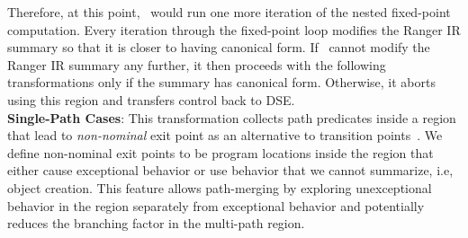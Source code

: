%
Therefore, at this point, \tool\ would run one more iteration of the nested fixed-point computation.
%
Every iteration through the fixed-point loop modifies the Ranger IR summary so that it is closer to having canonical
form.
%
If \tool\ cannot modify the Ranger IR summary any further, it then proceeds with the following transformations only
if the summary has canonical form.
%
Otherwise, it aborts using this region and transfers control back to DSE.\\
%
\textbf{Single-Path Cases}: This transformation collects path predicates inside a region that lead to
\textit{non-nominal} exit point as an alternative to transition points~\cite{veritesting}.
%
We define non-nominal exit points to be program locations inside the region that either cause
exceptional behavior or use behavior that we cannot summarize, i.e, object creation.
%
This feature allows path-merging by exploring unexceptional behavior in the region separately from
exceptional behavior and potentially reduces the branching factor in the multi-path region.
%
%

